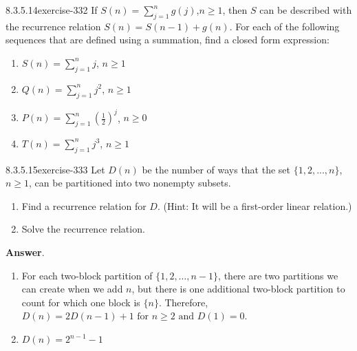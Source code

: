 \documentclass[twoside,10pt,]{book}
\numberwithin{equation}{section}
\begin{document}
\begin{divisionsolution}{8.3.5.14}{}{exercise-332}%
\hypertarget{p-2735}{}%
If \(S(n)=\sum_{j=1}^n g(j)\),\(n\geq 1\), then \(S\) can be described with the recurrence relation \(S(n) = S(n-1) + g(n)\). For each of the following sequences that are defined using a summation, find a closed form expression:%
\par
\hypertarget{p-2736}{}%
\leavevmode%
\begin{enumerate}[label=(\alph*)]
\item\hypertarget{li-1352}{}\hypertarget{p-2737}{}%
\(S(n) =\sum_{j=1}^n j\), \(n\geq 1\)%
\item\hypertarget{li-1353}{}\hypertarget{p-2738}{}%
\(Q(n) = \sum_{j=1}^n j^2\), \(n\geq 1\)%
\item\hypertarget{li-1354}{}\hypertarget{p-2739}{}%
\(P(n) =\)\(\sum_{j=1}^n \left(\frac{1}{2}\right)^j\), \(n\geq 0\)%
\item\hypertarget{li-1355}{}\hypertarget{p-2740}{}%
\(T(n)= \sum_{j=1}^n j^3\), \(n\geq 1\)%
\end{enumerate}
%
\end{divisionsolution}%
\begin{divisionsolution}{8.3.5.15}{}{exercise-333}%
\hypertarget{p-2741}{}%
Let \(D(n)\) be the number of ways that the set \(\{1, 2, . . . , n\}\), \(n \geq  1\), can be partitioned into two nonempty subsets.%
\par
\hypertarget{p-2742}{}%
\leavevmode%
\begin{enumerate}[label=(\alph*)]
\item\hypertarget{li-1356}{}\hypertarget{p-2743}{}%
Find a recurrence relation for \(D\). (Hint: It will be a first-order linear relation.)%
\item\hypertarget{li-1357}{}\hypertarget{p-2744}{}%
Solve the recurrence relation.%
\end{enumerate}
%
\par\smallskip%
\noindent\textbf{Answer}.\quad%
\hypertarget{p-2745}{}%
\leavevmode%
\begin{enumerate}[label=(\alph*)]
\item\hypertarget{li-1358}{}\hypertarget{p-2746}{}%
For each two-block partition of \(\{1,2,\dots, n-1\}\), there are two partitions we can create when we add \(n\), but there is one additional two-block partition to count for which one block is \(\{n\}\).  Therefore,  \(D(n)=2D(n-1)+1 \textrm{ for } n \geq 2 \textrm{ and } D(1)=0.\)%
\item\hypertarget{li-1359}{}\hypertarget{p-2747}{}%
\(D(n)=2^{n-1}-1\)%
\end{enumerate}
%
\end{divisionsolution}%
\end{document}
